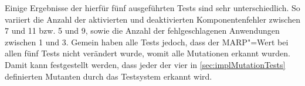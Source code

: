 Einige Ergebnisse der hierfür fünf ausgeführten Tests sind sehr unterschiedlich.
So variiert die Anzahl der aktivierten und deaktivierten Komponentenfehler zwischen 7 und 11 bzw. 5 und 9, sowie die Anzahl der fehlgeschlagenen Anwendungen zwischen 1 und 3.
Gemein haben alle Tests jedoch, dass der \gls{MARP}"=Wert bei allen fünf Tests nicht verändert wurde, womit alle Mutationen erkannt wurden.
Damit kann festgestellt werden, dass jeder der vier in \cref{sec:implMutationTests} definierten Mutanten durch das Testsystem erkannt wird.
